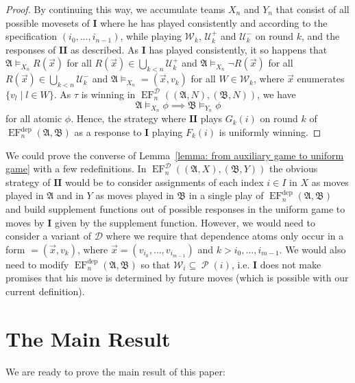 \documentclass[12pt]{article}
\theoremstyle{definition}
\newcommand{\playerone}{\mathrm{\mathbf{I}}}
\newcommand{\playertwo}{\mathrm{\mathbf{II}}}
\DeclareMathOperator{\EF}{EF}
\newcommand{\EFdep}{\EF^{\mathrm{dep}}}
\newcommand{\W}{\mathcal W}
\newcommand{\U}{\mathcal U}
\newcommand{\A}{\mathfrak{A}}
\newcommand{\B}{\mathfrak{B}}
\newcommand{\dep}{\mathop{=}}
\newcommand{\deplog}{\mathcal D}
\DeclareMathOperator{\Pow}{\mathcal{P}}
\begin{document}
\begin{proof}
    By continuing this way, we accumulate teams $X_n$ and $Y_n$ that consist of all possible movesets of $\playerone$ where he has played consistently and according to the specification $(i_0,\dots,i_{n-1})$, while playing $\W_k$, $\U^+_k$ and $\U^-_k$ on round $k$, and the responses of $\playertwo$ as described. As $\playerone$ has played consistently, it so happens that $\A\models_{X_n}R(\vec x)$ for all $R(\vec x)\in\bigcup_{k<n}\U^+_k$ and $\A\models_{X_n}\neg R(\vec x)$ for all $R(\vec x)\in\bigcup_{k<n}\U^-_k$ and $\A\models_{X_n}\dep(\vec x,v_k)$ for all $W\in\W_k$, where $\vec x$ enumerates $\{v_l \mid l\in W\}$. As $\tau$ is winning in $\EF_n^\deplog((\A,N),(\B,N))$, we have
    \[
        \A\models_{X_n}\phi \implies \B\models_{Y_n}\phi
    \]
    for all atomic $\phi$. Hence, the strategy where $\playertwo$ plays $G_k(i)$ on round $k$ of $\EFdep_n(\A,\B)$ as a response to $\playerone$ playing $F_k(i)$ is uniformly winning.
\end{proof}

We could prove the converse of Lemma~\ref{lemma: from auxiliary game to uniform game} with a few redefinitions. In $\EF_n^\deplog((\A,X),(\B,Y))$ the obvious strategy of $\playertwo$ would be to consider assignments of each index $i\in I$ in $X$ as moves played in $\A$ and in $Y$ as moves played in $\B$ in a single play of $\EFdep_n(\A,\B)$ and build supplement functions out of possible responses in the uniform game to moves by $\playerone$ given by the supplement function. However, we would need to consider a variant of $\deplog$ where we require that dependence atoms only occur in a form $\dep(\vec x, v_k)$, where $\vec x = (v_{i_0},\dots,v_{i_{m-1}})$ and $k>i_0,\dots,i_{m-1}$. We would also need to modify $\EFdep_n(\A,\B)$ so that $\W_i\subseteq\Pow(i)$, i.e. $\playerone$ does not make promises that his move is determined by future moves (which is possible with our current definition).





\section{The Main Result}\label{Uniform game vs. logic}

We are ready to prove the main result of this paper:
\end{document}
